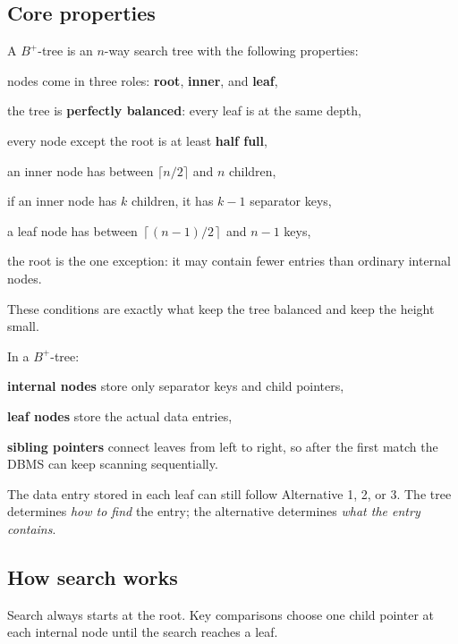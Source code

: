 \documentclass[../../dis.tex]{subfiles}
\begin{document}
\subsection{Core properties}
A \mbox{$B^+$-tree} is an \(n\)-way search tree with the following properties:
\begin{dashlist}
    \item nodes come in three roles: \textbf{root}, \textbf{inner}, and \textbf{leaf},
    \item the tree is \textbf{perfectly balanced}: every leaf is at the same depth,
    \item every node except the root is at least \textbf{half full},
    \item an inner node has between \(\lceil n/2 \rceil\) and \(n\) children,
    \item if an inner node has \(k\) children, it has \(k-1\) separator keys,
    \item a leaf node has between \(\left\lceil (n-1)/2 \right\rceil\) and \(n-1\) keys,
    \item the root is the one exception: it may contain fewer entries than ordinary internal nodes.
\end{dashlist}

These conditions are exactly what keep the tree balanced and keep the height small.

\begin{schema}
{}\par}
\end{schema}

In a \mbox{$B^+$-tree}:
\begin{dashlist}
    \item \textbf{internal nodes} store only separator keys and child pointers,
    \item \textbf{leaf nodes} store the actual data entries,
    \item \textbf{sibling pointers} connect leaves from left to right, so after the first match the DBMS can keep scanning sequentially.
\end{dashlist}

The data entry stored in each leaf can still follow Alternative 1, 2, or 3. The tree determines \emph{how to find} the entry; the alternative determines \emph{what the entry contains}.

\subsection{How search works}
Search always starts at the root. Key comparisons choose one child pointer at each internal node until the search reaches a leaf.
\end{document}
